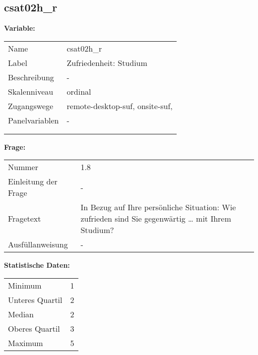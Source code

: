 	
	
	\subsection{csat02h\_r}
	\label{subSection:csat02h_r}

	\noindent\textbf{Variable:}\\
		\begin{tabular}{lL{11.3cm}}
			\label{tableVariable:csat02h_r}
			Name & csat02h\_r \\
			Label & Zufriedenheit: Studium \\
			Beschreibung & - \\
			Skalenniveau & ordinal \\
			Zugangswege &
				remote-desktop-suf,
				onsite-suf,
 \\
			Panelvariablen & -
			 \\
			 \\
 \\
		\end{tabular}

		\vspace*{1 cm}
		\noindent\textbf{Frage:}\\
		\begin{tabular}{lL{11.3cm}}
			\label{tableQuestion:csat02h_r}
			Nummer & 1.8 \\
			Einleitung der Frage & - \\
			Fragetext & In Bezug auf Ihre persönliche Situation: Wie zufrieden sind Sie gegenwärtig …
mit Ihrem Studium? \\
			Ausfüllanweisung & - \\
		\end{tabular}


		\vspace*{1 cm}
		\noindent\textbf{Statistische Daten:}\\
			\begin{tabular}{ll}
				\label{tableStatistics:csat02h_r}
					Minimum & 1 \\
					Unteres Quartil & 2 \\
					Median & 2 \\
					Oberes Quartil & 3 \\
					Maximum & 5 \\
			\end{tabular}



